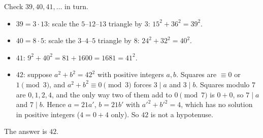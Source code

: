 Check $39,40,41,\dots$ in turn.
\begin{itemize}
\item $39=3\cdot13$: scale the $5$--$12$--$13$ triangle by $3$: $15^2+36^2=39^2$.
\item $40=8\cdot5$: scale the $3$--$4$--$5$ triangle by $8$: $24^2+32^2=40^2$.
\item $41$: $9^2+40^2=81+1600=1681=41^2$.
\item $42$: suppose $a^2+b^2=42^2$ with positive integers $a,b$. Squares are $\equiv0$ or $1\pmod3$, and $a^2+b^2\equiv0\pmod3$ forces $3\mid a$ and $3\mid b$. Squares modulo $7$ are $0,1,2,4$, and the only way two of them add to $0\pmod7$ is $0+0$, so $7\mid a$ and $7\mid b$. Hence $a=21a'$, $b=21b'$ with $a'^2+b'^2=4$, which has no solution in positive integers ($4=0+4$ only). So $42$ is not a hypotenuse.
\end{itemize}
The answer is $\boxed{42}$.
